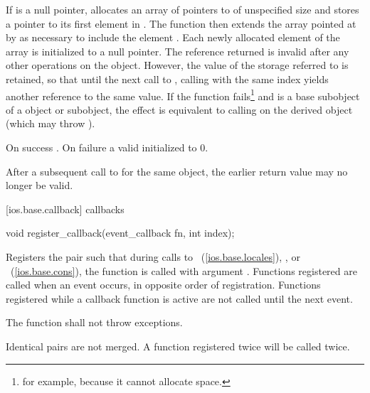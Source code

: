 \begin{itemdescr}
\pnum
\effects
If  is a null pointer, allocates an array of
pointers to  of unspecified size and stores a pointer to
its
first element in .
The function then extends the array
pointed at by  as necessary to include the element
.
Each newly allocated element of the array is initialized to a null
pointer.
The reference returned is invalid after any other operations on the
object.
However, the value of the storage referred to is retained, so
that until the next call to
,
calling
with the same index yields another reference to the same value.
If the function fails\footnote{for example, because it cannot allocate space.}
and
is a base subobject of a
object or subobject, the effect is equivalent to calling
on the derived object (which may throw
).

\pnum
\returns
On success
.
On failure a valid
initialized to 0.

\pnum
\remarks
After a subsequent call to
for the same object, the earlier return value may no longer be valid.
\end{itemdescr}

[ios.base.callback]{ callbacks}

%
\begin{itemdecl}
void register_callback(event_callback fn, int index);
\end{itemdecl}

\begin{itemdescr}
\pnum
\effects
Registers the pair
such that during calls to
~(\ref{ios.base.locales}),
,
or
~(\ref{ios.base.cons}),
the function
is called with argument
.
Functions registered are called when an event occurs, in opposite order of
registration.
Functions registered while a callback function is active are not called until the next event.

\pnum
\requires
The function
shall not throw exceptions.

\remarks
Identical pairs are not merged.
A function registered twice will be called twice.
\end{itemdescr}

